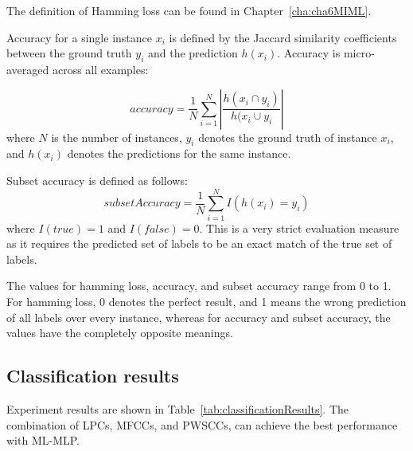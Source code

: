 The definition of Hamming loss can be found in Chapter~\ref{cha:cha6MIML}.

Accuracy for a single instance $x_{i}$ is defined by the Jaccard similarity coefficients between the ground truth $y_{i}$ and the prediction $h(x_{i})$. Accuracy is micro-averaged across all examples:

\begin{equation}
accuracy = \frac{1}{N}\sum_{i=1}^{N}|\frac{h(x_{i} \cap y_{i})}{h(x_{i} \cup y_{i}}|
\end{equation}
where $N$ is the number of instances, $y_{i}$ denotes the ground truth of instance $x_{i}$, and $h(x_{i})$ denotes the predictions for the same instance. 


Subset accuracy is defined as follows:
\begin{equation}
subsetAccuracy = \frac{1}{N}\sum_{i=1}^{N}I(h(x_{i})=y_{i})
\end{equation}
where $I(true)=1$ and $I(false)=0$. This is a very strict evaluation
measure as it requires the predicted set of labels to be an exact
match of the true set of labels.


The values for hamming loss, accuracy, and subset accuracy range from 0 to 1. For hamming loss, 0 denotes the perfect result, and 1 means the wrong prediction of all labels over every instance, whereas for accuracy and subset accuracy, the values have the completely opposite meanings.



\subsection{Classification results}

Experiment results are shown in Table~\ref{tab:classificationResults}. The combination of LPCs, MFCCs, and PWSCCs, can achieve the best performance with ML-MLP. 




